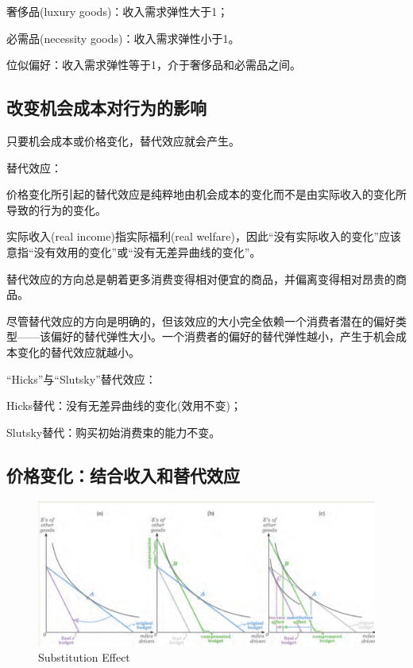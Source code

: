 \documentclass{article}
\begin{document}
奢侈品(luxury goods)：收入需求弹性大于1；

必需品(necessity goods)：收入需求弹性小于1。

位似偏好：收入需求弹性等于1，介于奢侈品和必需品之间。

\subsection{改变机会成本对行为的影响}

只要机会成本或价格变化，替代效应就会产生。

替代效应：

价格变化所引起的替代效应是纯粹地由机会成本的变化而不是由实际收入的变化所导致的行为的变化。

实际收入(real income)指实际福利(real welfare)，因此“没有实际收入的变化”应该意指“没有效用的变化”或“没有无差异曲线的变化”。

\hspace*{\fill}

替代效应的方向总是朝着更多消费变得相对便宜的商品，并偏离变得相对昂贵的商品。

\hspace*{\fill}

尽管替代效应的方向是明确的，但该效应的大小完全依赖一个消费者潜在的偏好类型——该偏好的替代弹性大小。一个消费者的偏好的替代弹性越小，产生于机会成本变化的替代效应就越小。

\hspace*{\fill}

“Hicks”与“Slutsky”替代效应：

Hicks替代：没有无差异曲线的变化(效用不变)；

Slutsky替代：购买初始消费束的能力不变。

\subsection{价格变化：结合收入和替代效应}

\begin{figure}[H] %
	\centering %
	\includegraphics[width=1\textwidth]{substitution_7_5} %
	\caption{Substitution Effect} %
	\label{Fig.main2} %
\end{figure}
\end{document}
